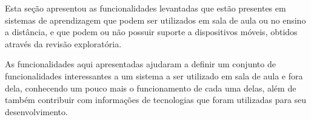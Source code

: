 Esta seção apresentou as funcionalidades levantadas que estão presentes em sistemas de aprendizagem que podem ser utilizados em sala de aula ou no ensino a distância, e que podem ou não possuir suporte a dispositivos móveis, obtidos através da revisão exploratória.

As funcionalidades aqui apresentadas ajudaram a definir um conjunto de funcionalidades interessantes a um sistema a ser utilizado em sala de aula e fora dela, conhecendo um pouco mais o funcionamento de cada uma delas, além de também contribuir com informações de tecnologias que foram utilizadas para seu desenvolvimento.